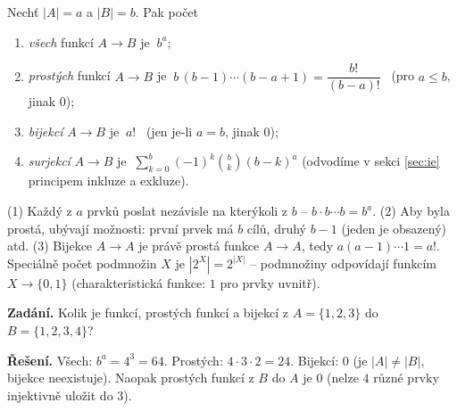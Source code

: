 \documentclass[11pt,a4paper]{article}
\begin{document}
\begin{veta}
Nechť $|A|=a$ a $|B|=b$. Pak počet
\begin{enumerate}[label=(\arabic*)]
  \item \emph{všech} funkcí $A\to B$ je $\ b^{a}$;
  \item \emph{prostých} funkcí $A\to B$ je $\ b\,(b-1)\cdots(b-a+1)=\dfrac{b!}{(b-a)!}$ \ (pro $a\le b$, jinak $0$);
  \item \emph{bijekcí} $A\to B$ je $\ a!$ \ (jen je-li $a=b$, jinak $0$);
  \item \emph{surjekcí} $A\to B$ je $\ \displaystyle\sum_{k=0}^{b}(-1)^k\binom{b}{k}(b-k)^{a}$ (odvodíme v sekci \ref{sec:ie} principem inkluze a exkluze).
\end{enumerate}
\end{veta}

\begin{intuice}
(1) Každý z $a$ prvků poslat nezávisle na kterýkoli z $b$ -- $b\cdot b\cdots b=b^a$. (2) Aby byla prostá, ubývají možnosti: první prvek má $b$ cílů, druhý $b-1$ (jeden je obsazený) atd. (3) Bijekce $A\to A$ je právě prostá funkce $A\to A$, tedy $a(a-1)\cdots1=a!$. Speciálně počet podmnožin $X$ je $|2^X|=2^{|X|}$ -- podmnožiny odpovídají funkcím $X\to\{0,1\}$ (charakteristická funkce: $1$ pro prvky uvnitř).
\end{intuice}

\begin{priklad}
\textbf{Zadání.} Kolik je funkcí, prostých funkcí a bijekcí z $A=\{1,2,3\}$ do $B=\{1,2,3,4\}$?

\textbf{Řešení.} Všech: $b^a=4^3=64$. Prostých: $4\cdot3\cdot2=24$. Bijekcí: $0$ (je $|A|\neq|B|$, bijekce neexistuje). Naopak prostých funkcí z $B$ do $A$ je $0$ (nelze $4$ různé prvky injektivně uložit do $3$).
\end{priklad}
\end{document}
